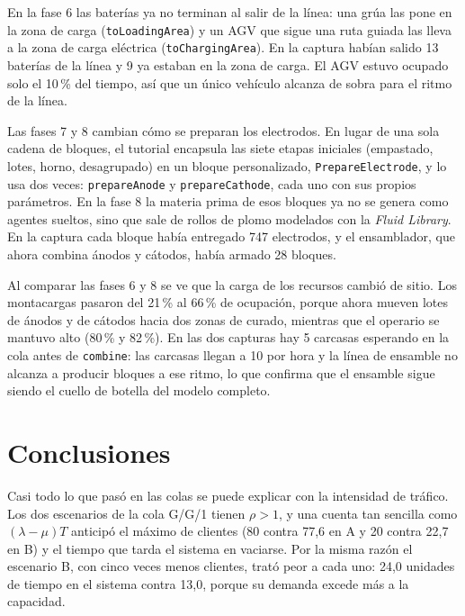 \documentclass[11pt,letterpaper]{article}
\begin{document}
En la fase 6 las baterías ya no terminan al salir de la línea: una grúa las pone en la zona de carga
(\texttt{toLoadingArea}) y un AGV que sigue una ruta guiada las lleva a la zona de carga eléctrica
(\texttt{toChargingArea}). En la captura habían salido 13 baterías de la línea y 9 ya estaban en la zona de carga.
El AGV estuvo ocupado solo el 10\,\% del tiempo, así que un único vehículo alcanza de sobra para el ritmo de la
línea.

Las fases 7 y 8 cambian cómo se preparan los electrodos. En lugar de una sola cadena de bloques, el tutorial
encapsula las siete etapas iniciales (empastado, lotes, horno, desagrupado) en un bloque personalizado,
\texttt{PrepareElectrode}, y lo usa dos veces: \texttt{prepareAnode} y \texttt{prepareCathode}, cada uno con sus
propios parámetros. En la fase 8 la materia prima de esos bloques ya no se genera como agentes sueltos, sino que
sale de rollos de plomo modelados con la \emph{Fluid Library}. En la captura cada bloque había entregado 747
electrodos, y el ensamblador, que ahora combina ánodos y cátodos, había armado 28 bloques.

Al comparar las fases 6 y 8 se ve que la carga de los recursos cambió de sitio. Los montacargas pasaron del 21\,\%
al 66\,\% de ocupación, porque ahora mueven lotes de ánodos y de cátodos hacia dos zonas de curado, mientras que
el operario se mantuvo alto (80\,\% y 82\,\%). En las dos capturas hay 5 carcasas esperando en la cola antes de
\texttt{combine}: las carcasas llegan a 10 por hora y la línea de ensamble no alcanza a producir bloques a ese
ritmo, lo que confirma que el ensamble sigue siendo el cuello de botella del modelo completo.

\section{Conclusiones}

Casi todo lo que pasó en las colas se puede explicar con la intensidad de tráfico. Los dos escenarios de la
cola G/G/1 tienen $\rho > 1$, y una cuenta tan sencilla como $(\lambda - \mu)T$ anticipó el máximo de clientes
(80 contra 77,6 en A y 20 contra 22,7 en B) y el tiempo que tarda el sistema en vaciarse. Por la misma razón el
escenario B, con cinco veces menos clientes, trató peor a cada uno: 24,0 unidades de tiempo en el sistema contra
13,0, porque su demanda excede más a la capacidad.
\end{document}
